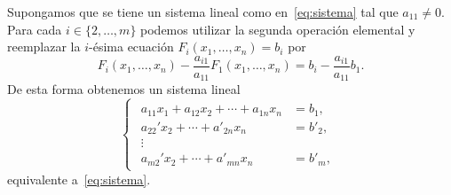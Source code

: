 \begin{block}
	\label{block:sistemas:gauss}
    Supongamos que se tiene un sistema lineal como en~\eqref{eq:sistema} tal
    que $a_{11}\ne0$. Para cada $i\in\{2,\dots,m\}$ podemos utilizar la segunda
    operación elemental y reemplazar la $i$-ésima ecuación
    $F_i(x_1,\dots,x_n)=b_i$ por 
	\[
		F_i(x_1,\dots,x_n)-\frac{a_{i1}}{a_{11}}F_1(x_1,\dots,x_n)=b_i-\frac{a_{i1}}{a_{11}}b_1.
	\]
	De esta forma obtenemos un sistema lineal 
	\begin{equation*}
		\begin{cases}
			\begin{aligned}
				a_{11}x_1+a_{12}x_2+\cdots+a_{1n}x_n&=b_1,\\
				a_{22}'x_2+\cdots+a'_{2n}x_{n}&=b'_2,\\
				\vdots\\
				a_{m2}'x_2+\cdots+a'_{mn}x_{n}&=b'_m,
			\end{aligned}
		\end{cases}
	\end{equation*}
	equivalente a~\eqref{eq:sistema}. 
\end{block}

